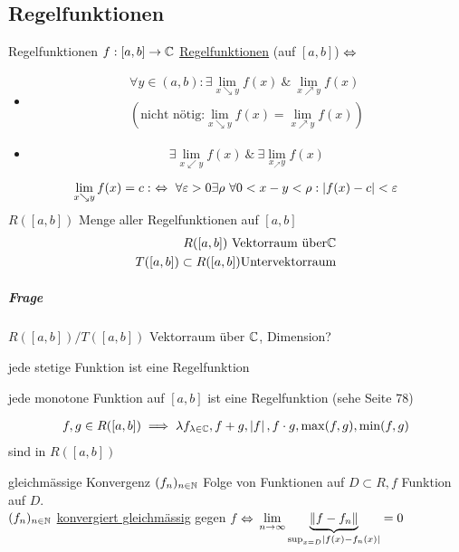 \subsection{Regelfunktionen}
\begin{Def}{Regelfunktionen}
  $f:[a,b] \to\mathbb{C}$ \underline{Regelfunktionen} (auf $[a,b]$) $\Leftrightarrow$
  \begin{itemize}
    \item 
      \begin{align*}
        \forall y\in(a,b):\exists \lim_{x\searrow y}f(x)\ \&\ \lim_{x\nearrow y} f(x)\\
        (\text{nicht nötig:} \lim_{x\searrow y} f(x) = \lim_{x\nearrow y}f(x))
      \end{align*}
    \item \[\exists \lim_{x\swarrow y} f(x)\ \&\ \exists \lim_{x_\nearrow y} f(x)\]
  \end{itemize}
\end{Def}
\begin{Bem}
  \[\lim_{x\searrow y} f(x)=c:\ \Lra\ \forall \varepsilon > 0 \exists \rho\ \forall 0<x-y<\rho: \Abs{f(x)-c}<\varepsilon\]
  $R([a,b])$ Menge aller Regelfunktionen auf $[a,b]$
  \begin{align*}
    R([a,b])\ \text{Vektorraum über} \mathbb{C}\\
    T([a,b])\subset R([a,b]) \text{Untervektorraum}
  \end{align*}
  \subparagraph{Frage}$R([a,b])/T([a,b])$ Vektorraum über $\mathbb{C}$, Dimension?
\end{Bem}
\begin{Bsp}
  jede stetige Funktion ist eine Regelfunktion
\end{Bsp}
\begin{Bsp}
  jede monotone Funktion auf $[a,b]$ ist eine Regelfunktion (sehe Seite 78)
\end{Bsp}
\begin{Bem}
  \begin{align*}
  f,g\in R([a,b])\implies \lambda f_{\lambda\in\mathbb{C}}, f+g, \left| f \right|, f\cdot g, \max(f,g), \min(f,g)
  \end{align*}
  sind in $R([a,b])$
\end{Bem}
\begin{Def}{gleichmässige Konvergenz}
  $(f_n)_{n\in\mathbb{N}}$ Folge von Funktionen auf $D\subset R, f$ Funktion auf $D$.\\
  $(f_n)_{n\in\mathbb{N}}$ \underline{konvergiert gleichmässig} gegen $f$ $\Leftrightarrow$ $\displaystyle\lim_{n\rightarrow\infty} \underbrace{\left\| f-f_n \right\|}_{\sup_{x=D}\left| f(x)-f_n(x) \right|}=0$
\end{Def}
